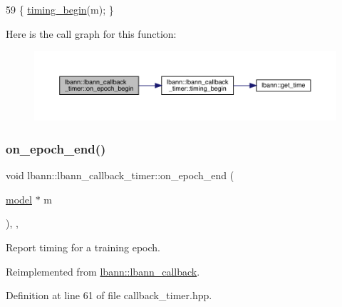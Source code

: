 \begin{DoxyCode}
59 \{ \hyperlink{classlbann_1_1lbann__callback__timer_a5eb2a9d5c0c2fe4a7d7f45369928e2fd}{timing\_begin}(m); \}
\end{DoxyCode}
Here is the call graph for this function\+:\nopagebreak
\begin{figure}[H]
\begin{center}
\leavevmode
\includegraphics[width=350pt]{classlbann_1_1lbann__callback__timer_aceecdd208aa8d75a49a41a33bf48314b_cgraph}
\end{center}
\end{figure}
\mbox{\label{classlbann_1_1lbann__callback__timer_a95ccee037894dbb5e3c663fbdfbc9d7f}} 
\subsubsection{\texorpdfstring{on\+\_\+epoch\+\_\+end()}{on\_epoch\_end()}}
{\footnotesize\ttfamily void lbann\+::lbann\+\_\+callback\+\_\+timer\+::on\+\_\+epoch\+\_\+end (\begin{DoxyParamCaption}\item[{\hyperlink{classlbann_1_1model}{model} $\ast$}]{m }\end{DoxyParamCaption})\hspace{0.3cm}{\ttfamily [inline]}, {\ttfamily [override]}, {\ttfamily [virtual]}}

Report timing for a training epoch. 

Reimplemented from \hyperlink{classlbann_1_1lbann__callback_a1fc71110e7f754bf73c9e0f344a448a5}{lbann\+::lbann\+\_\+callback}.



Definition at line 61 of file callback\+\_\+timer.\+hpp.


